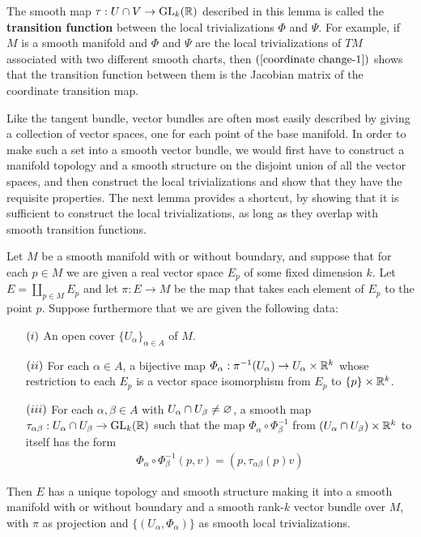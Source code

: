 The smooth map $\tau:U\cap V\to\mathrm{GL}_k(\mathbb{R})$ described in this lemma is called the \textbf{transition function} between the local trivializations $\varPhi$ and $\varPsi$. For example, if $M$ is a smooth manifold and $\varPhi$ and $\varPsi$ are the local trivializations of $TM$ associated with two different smooth charts, then $(\ref{coordinate change-1})$ shows that the transition function between them is the Jacobian matrix of the coordinate transition map.\par
Like the tangent bundle, vector bundles are often most easily described by giving a collection of vector spaces, one for each point of the base manifold. In order to make such a set into a smooth vector bundle, we would first have to construct a manifold topology and a smooth structure on the disjoint union of all the vector spaces, 
and then construct the local trivializations and show that they have the requisite properties. The next lemma provides a shortcut, by showing that it is sufficient to construct the local trivializations, 
as long as they overlap with smooth transition functions.
\begin{lemma}\label{vector bundle chart lemma}
Let $M$ be a smooth manifold with or without boundary, and suppose that for each $p\in M$ we are given a real vector space $E_p$ of some fixed dimension $k$. Let $E=\coprod_{p\in M}E_p$ and let $\pi:E\to M$ be the map that takes each element of $E_p$ to the point $p$. Suppose furthermore that we are given the following data:
\begin{itemize}
\item[$(\rmnum{1})$] An open cover $\{U_\alpha\}_{\alpha\in A}$ of $M$.
\item[$(\rmnum{2})$] For each $\alpha\in A$, a bijective map $\varPhi_\alpha:\pi^{-1}(U_\alpha)\to U_\alpha\times\mathbb{R}^k$ whose restriction to each $E_p$ is a vector space isomorphism from $E_p$ to $\{p\}\times\mathbb{R}^k$.
\item[$(\rmnum{3})$] For each $\alpha,\beta\in A$ with $U_\alpha\cap U_\beta\neq\varnothing$, a smooth map $\tau_{\alpha\beta}:U_\alpha\cap U_\beta\to\mathrm{GL}_k(\mathbb{R})$ such that the map $\varPhi_\alpha\circ\varPhi_\beta^{-1}$ from $(U_\alpha\cap U_\beta)\times\mathbb{R}^k$ to itself has the form
\begin{align}\label{vector bundle transition function-1}
\varPhi_\alpha\circ\varPhi_\beta^{-1}(p,v)=(p,\tau_{\alpha\beta}(p)v)
\end{align}
\end{itemize}
Then $E$ has a unique topology and smooth structure making it into a smooth manifold with or without boundary and a smooth rank-$k$ vector bundle over $M$, with $\pi$
as projection and $\{(U_\alpha,\varPhi_\alpha)\}$ as smooth local trivializations.
\end{lemma}
